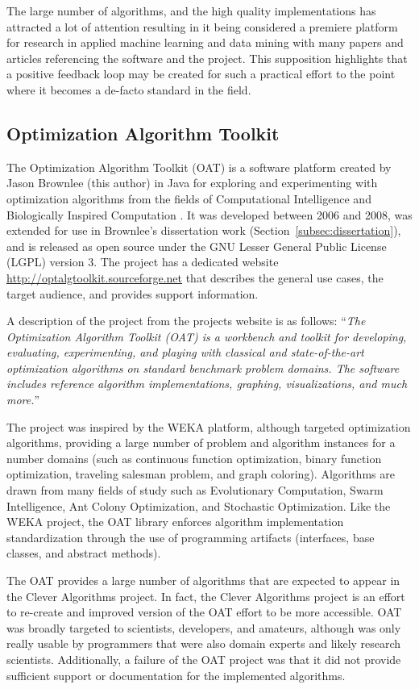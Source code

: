 \documentclass[a4paper, 11pt]{article}
\begin{document}
The large number of algorithms, and the high quality implementations has attracted a lot of attention resulting in it being considered a premiere platform for research in applied machine learning and data mining with many papers and articles referencing the software and the project. This supposition highlights that a positive feedback loop may be created for such a practical effort to the point where it becomes a de-facto standard in the field. 

% 
% 
\subsection{Optimization Algorithm Toolkit}
The Optimization Algorithm Toolkit (OAT) is a software platform created by Jason Brownlee (this author) in Java for exploring and experimenting with optimization algorithms from the fields of Computational Intelligence and Biologically Inspired Computation \cite{Brownlee2007}. It was developed between 2006 and 2008, was extended for use in Brownlee's dissertation work (Section~\ref{subsec:dissertation}), and is released as open source under the GNU Lesser General Public License (LGPL) version 3. The project has a dedicated website \url{http://optalgtoolkit.sourceforge.net} that describes the general use cases, the target audience, and provides support information.

A description of the project from the projects website is as follows: ``\emph{The Optimization Algorithm Toolkit (OAT) is a workbench and toolkit for developing, evaluating, experimenting, and playing with classical and state-of-the-art optimization algorithms on standard benchmark problem domains. The software includes reference algorithm implementations, graphing, visualizations, and much more.}''

The project was inspired by the WEKA platform, although targeted optimization algorithms, providing a large number of problem and algorithm instances for a number domains (such as continuous function optimization, binary function optimization, traveling salesman problem, and graph coloring). Algorithms are drawn from many fields of study such as Evolutionary Computation, Swarm Intelligence, Ant Colony Optimization, and Stochastic Optimization. Like the WEKA project, the OAT library enforces algorithm implementation standardization through the use of programming artifacts (interfaces, base classes, and abstract methods).

The OAT provides a large number of algorithms that are expected to appear in the Clever Algorithms project. In fact, the Clever Algorithms project is an effort to re-create and improved version of the OAT effort to be more accessible. OAT was broadly targeted to scientists, developers, and amateurs, although was only really usable by programmers that were also domain experts and likely research scientists. Additionally, a failure of the OAT project was that it did not provide sufficient support or documentation for the implemented algorithms. 
\end{document}

